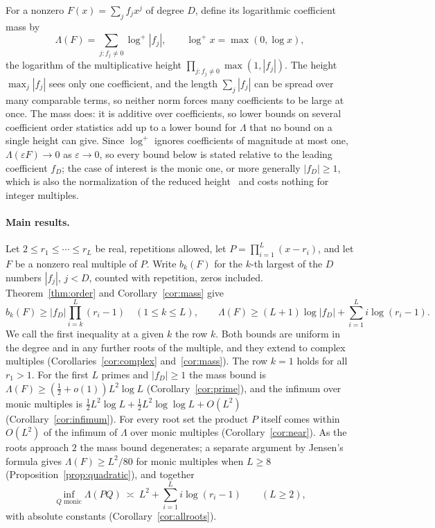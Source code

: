 \documentclass[11pt]{article}
\begin{document}
For a nonzero $F(x)=\sum_jf_jx^j$ of degree $D$, define its logarithmic
coefficient mass by
\[
  \Lambda(F)=\sum_{j:f_j\ne0}\log^+|f_j|,
  \qquad \log^+x=\max(0,\log x),
\]
the logarithm of the multiplicative height $\prod_{j:f_j\ne0}\max(1,|f_j|)$.
The height $\max_j|f_j|$ sees only one coefficient, and the length
$\sum_j|f_j|$ can be spread over many comparable terms, so neither norm
forces many coefficients to be large at once.  The mass does: it is additive
over coefficients, so lower bounds on several coefficient order statistics
add up to a lower bound for $\Lambda$ that no bound on a single height can
give.  Since $\log^+$
ignores coefficients of magnitude at most one, $\Lambda(\varepsilon F)\to0$
as $\varepsilon\to0$, so every bound below is stated relative to the
leading coefficient $f_D$; the case of interest is the monic one, or more
generally $|f_D|\ge1$, which is also the normalization of the reduced
height~\cite{dj} and costs nothing for integer multiples.

\paragraph{Main results.}
Let $2\le r_1\le\cdots\le r_L$ be real, repetitions allowed, let
$P=\prod_{i=1}^L(x-r_i)$, and let $F$ be a nonzero real multiple of $P$.
Write $b_k(F)$ for the $k$-th largest of the $D$ numbers $|f_j|$, $j<D$,
counted with repetition, zeros included.  Theorem~\ref{thm:order} and
Corollary~\ref{cor:mass} give
\[
  b_k(F)\ge|f_D|\prod_{i=k}^{L}(r_i-1)
  \quad(1\le k\le L),
  \qquad
  \Lambda(F)\ge(L+1)\log|f_D|+\sum_{i=1}^{L}i\log(r_i-1).
\]
We call the first inequality at a given $k$ the row $k$.  Both bounds are
uniform in the degree and in any further roots of the multiple, and they
extend to complex multiples (Corollaries~\ref{cor:complex} and~\ref{cor:mass}).  The row $k=1$
holds for all $r_1>1$.  For the first $L$ primes and $|f_D|\ge1$ the mass bound is
$\Lambda(F)\ge(\frac12+o(1))L^2\log L$ (Corollary~\ref{cor:prime}), and the
infimum over monic multiples is
$\frac12L^2\log L+\frac12L^2\log\log L+O(L^2)$ (Corollary~\ref{cor:infimum}).
For every root set the product $P$ itself comes within $O(L^2)$ of the
infimum of $\Lambda$ over monic multiples (Corollary~\ref{cor:near}).  As
the roots approach $2$ the mass bound degenerates; a separate argument by
Jensen's formula gives $\Lambda(F)\ge L^2/80$ for monic multiples when
$L\ge8$ (Proposition~\ref{prop:quadratic}), and together
\[
  \inf_{Q\text{ monic}}\Lambda(PQ)\ \asymp\ L^2+\sum_{i=1}^Li\log(r_i-1)
  \qquad(L\ge2),
\]
with absolute constants (Corollary~\ref{cor:allroots}).
\end{document}
